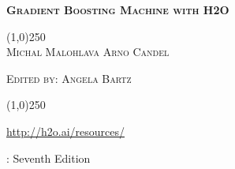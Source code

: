 
%



\usepackage{url}
\def\UrlBreaks{\do\/\do-\do_\do.}





\thispagestyle{empty} %


\begin{center}
\textsc{\Large\bf{Gradient Boosting Machine with H2O}}

\bigskip
\line(1,0){250}  %
\\
\bigskip
\small
\textsc{Michal Malohlava \hspace{10pt} Arno Candel}

\textsc{Edited by: Angela Bartz}

\normalsize

\line(1,0){250}  %

{\url{http://h2o.ai/resources/}}

\bigskip

\monthname \hspace{1pt}  \the\year: Seventh Edition

\bigskip
\end{center}


\newpage
\restoregeometry

\null\vfill %

\thispagestyle{empty}%

